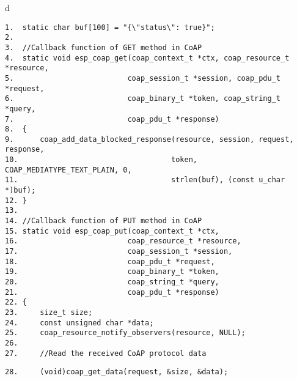 \documentclass[a4paper,12pt]{book}
\begin{document}
\begin{codebloc}
\begin{tabular}{d}
\vspace{2pt}
\begin{verbatim}
1.  static char buf[100] = "{\"status\": true}";
2.	
3.  //Callback function of GET method in CoAP
4.  static void esp_coap_get(coap_context_t *ctx, coap_resource_t *resource,
5.                          coap_session_t *session, coap_pdu_t *request,
6.                          coap_binary_t *token, coap_string_t *query,
7.                          coap_pdu_t *response)
8.  {
9.      coap_add_data_blocked_response(resource, session, request, response,
10.                                   token, COAP_MEDIATYPE_TEXT_PLAIN, 0,
11.                                   strlen(buf), (const u_char *)buf);
12. }
13.	
14. //Callback function of PUT method in CoAP
15. static void esp_coap_put(coap_context_t *ctx,
16.                         coap_resource_t *resource,
17.                         coap_session_t *session,
18.                         coap_pdu_t *request,
19.                         coap_binary_t *token,
20.                         coap_string_t *query,
21.                         coap_pdu_t *response)
22. {
23.     size_t size;
24.     const unsigned char *data;
25.     coap_resource_notify_observers(resource, NULL);
26.	
27.     //Read the received CoAP protocol data
\end{verbatim}
\verb|28.     (void)coap_get_data(request, &size, &data);|
\end{tabular}
\end{codebloc}
\end{document}

